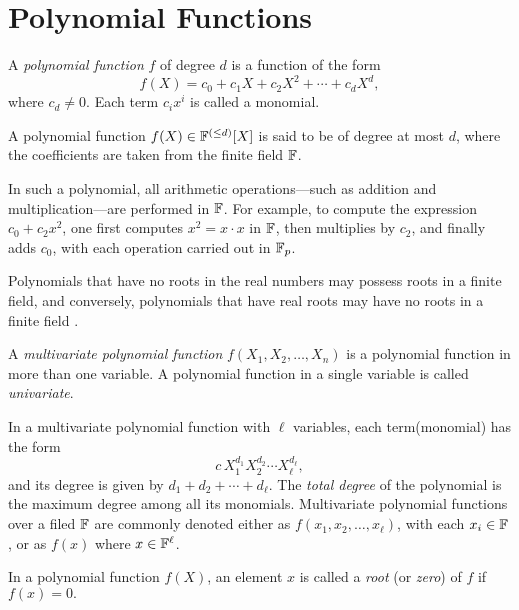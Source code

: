\chapter{Polynomial Functions}
\begin{definition}
    A \textit{polynomial function} $f$ of degree $d$ is a function of the form
    \[
        f(X) = c_0 + c_1 X + c_2 X^2 + \cdots + c_d X^d,
    \]
    where $c_d \neq 0$. Each term $c_i x^i$ is called a monomial.
\end{definition}

A polynomial function $f(X) \in \mathbb{F}^{(\leq d)}[X]$ is said to be of degree at most $d$, 
where the coefficients are taken from the finite field $\mathbb{F}$.

In such a polynomial, all arithmetic operations—such as addition and multiplication—are performed in $\mathbb{F}$. 
For example, to compute the expression $c_0 + c_2 x^2$, one first computes $x^2 = x \cdot x$ in $\mathbb{F}$, 
then multiplies by $c_2$, and finally adds $c_0$, with each operation carried out in $\mathbb{F}_p$.

\begin{remark}
    Polynomials that have no roots in the real numbers may possess roots in a finite field, 
    and conversely, polynomials that have real roots may have no roots in a finite field \cite{rareskills_finitefields}.
\end{remark}

\begin{definition}
    A \textit{multivariate polynomial function} $f(X_1, X_2, \ldots, X_n)$ is a polynomial function in more than one variable. 
    A polynomial function in a single variable is called \textit{univariate}.
\end{definition}

In a multivariate polynomial function with $\ell$ variables, each term(monomial) has the form 
\[
    c \, X_1^{d_1} X_2^{d_2} \cdots X_{\ell}^{d_{\ell}},
\]
and its degree is given by $d_1 + d_2 + \cdots + d_{\ell}$. 
The \textit{total degree} of the polynomial is the maximum degree among all its monomials. 
Multivariate polynomial functions over a filed $\mathbb{F}$ are commonly denoted either as $f(x_1, x_2, \ldots, x_{\ell})$, with each $x_i \in \mathbb{F}$, or as $f(x)$ where $x \in \mathbb{F}^{\ell}$.

\begin{definition}
    In a polynomial function $f(X)$, an element $x$ is called a \textit{root} (or \textit{zero}) of $f$ if
    $f(x) = 0.$
\end{definition}

